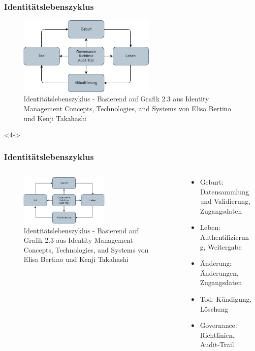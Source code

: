 \documentclass[11pt]{beamer}
\begin{document}
\begin{frame}
  \frametitle{Identitätslebenszyklus}
  \begin{figure}[H]
    \centering
    \includegraphics[width=0.6\textwidth]{assets/idlc.png}
    \caption{Identitätslebenszyklus - Basierend auf Grafik 2.3 aus \glqq{}Identity Management Concepts, Technologies, and Systems\grqq{} von Elisa Bertino und Kenji Takahashi}\label{fig:idlc}
  \end{figure}
\end{frame}

\begin{frame}<4->
  \frametitle{Identitätslebenszyklus}
  \begin{columns}
    \begin{column}{0.7\textwidth}
      \begin{figure}[H]
        \centering
        \includegraphics[width=0.6\textwidth]{assets/idlc.png}
        \caption{Identitätslebenszyklus - Basierend auf Grafik 2.3 aus \glqq{}Identity Management Concepts, Technologies, and Systems\grqq{} von Elisa Bertino und Kenji Takahashi}\label{fig:idlc}
      \end{figure}
    \end{column}
    \begin{column}{0.3\textwidth}
      \begin{itemize}
        \item Geburt: Datensammlung und Validierung, Zugangsdaten
        \item Leben: Authentifizierung, Weitergabe
        \item Änderung: Änderungen, Zugangsdaten
        \item Tod: Kündigung, Löschung
        \item Governance: Richtlinien, Audit-Trail
      \end{itemize}

    \end{column}
  \end{columns}
\end{frame}
\end{document}
